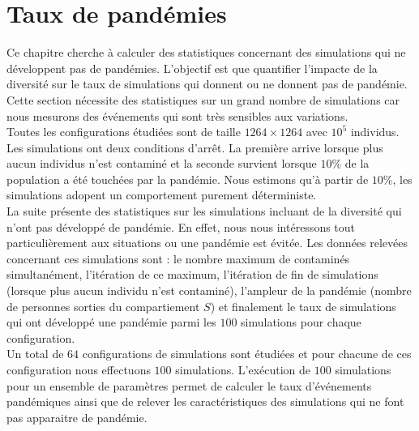 \section{Taux de pandémies}

Ce chapitre cherche à calculer des statistiques concernant des simulations qui ne développent pas de pandémies. L'objectif est que quantifier l'impacte de la diversité sur le taux de simulations qui donnent ou ne donnent pas de pandémie. Cette section nécessite des statistiques sur un grand nombre de simulations car nous mesurons des événements qui sont très sensibles aux variations.\\

Toutes les configurations étudiées sont de taille $1264	\times 1264$ avec $10^5$ individus. Les simulations ont deux conditions d'arrêt. La première arrive lorsque plus aucun individus n'est contaminé et la seconde survient lorsque $10\%$ de la population a été touchées par la pandémie. Nous estimons qu'à partir de $10\%$, les simulations adopent un comportement purement déterministe.\\

La suite présente des statistiques sur les simulations incluant de la diversité qui n'ont pas développé de pandémie. En effet, nous nous intéressons tout particulièrement aux situations ou une pandémie est évitée. Les données relevées concernant ces simulations sont : le nombre maximum de contaminés simultanément, l'itération de ce maximum, l'itération de fin de simulations (lorsque plus aucun individu n'est contaminé), l'ampleur de la pandémie (nombre de personnes sorties du compartiement $S$) et finalement le taux de simulations qui ont développé une pandémie parmi les $100$ simulations pour chaque configuration.\\

Un total de $64$ configurations de simulations sont étudiées et pour chacune de ces configuration nous effectuons $100$ simulations. L'exécution de $100$ simulations pour un ensemble de paramètres permet de calculer le taux d'événements pandémiques ainsi que de relever les caractéristiques des simulations qui ne font pas apparaitre de pandémie.

